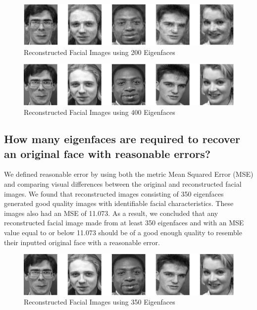 \documentclass[letterpaper,12pt]{article}
\begin{document}
\begin{figure}[htp]
    \centering
    \includegraphics[width=15cm]{faces200.png}
    \caption{Reconstructed Facial Images using 200 Eigenfaces}
    \label{faces200}
\end{figure}

\begin{figure}[htp]
    \centering
    \includegraphics[width=15cm]{faces400.png}
    \caption{Reconstructed Facial Images using 400 Eigenfaces}
    \label{faces400}
\end{figure}




\subsection{How many eigenfaces are required to recover an original face with reasonable errors?}\label{Q2.2}

We defined reasonable error by using both the metric Mean Squared Error (MSE) and comparing visual differences between the original and reconstructed facial images. We found that reconstructed images consisting of 350 eigenfaces generated good quality images with identifiable facial characteristics. These images also had an MSE of 11.073. As a result, we concluded that any reconstructed facial image made from at least 350 eigenfaces and with an MSE value equal to or below 11.073 should be of a good enough quality to resemble their inputted original face with a reasonable error. 

\begin{figure}[htp]
    \centering
    \includegraphics[width=15cm]{faces350.png}
    \caption{Reconstructed Facial Images using 350 Eigenfaces}
    \label{faces350}
\end{figure}
\end{document}
